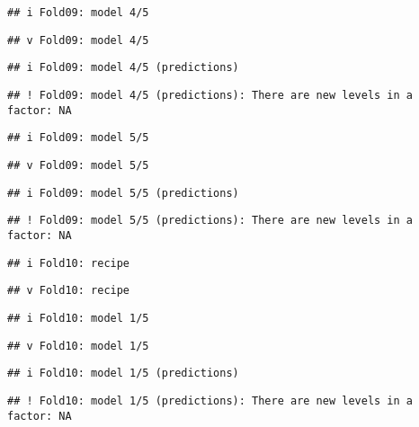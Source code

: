 \documentclass[
]{article}
\begin{document}
\begin{verbatim}
## i Fold09: model 4/5
\end{verbatim}

\begin{verbatim}
## v Fold09: model 4/5
\end{verbatim}

\begin{verbatim}
## i Fold09: model 4/5 (predictions)
\end{verbatim}

\begin{verbatim}
## ! Fold09: model 4/5 (predictions): There are new levels in a factor: NA
\end{verbatim}

\begin{verbatim}
## i Fold09: model 5/5
\end{verbatim}

\begin{verbatim}
## v Fold09: model 5/5
\end{verbatim}

\begin{verbatim}
## i Fold09: model 5/5 (predictions)
\end{verbatim}

\begin{verbatim}
## ! Fold09: model 5/5 (predictions): There are new levels in a factor: NA
\end{verbatim}

\begin{verbatim}
## i Fold10: recipe
\end{verbatim}

\begin{verbatim}
## v Fold10: recipe
\end{verbatim}

\begin{verbatim}
## i Fold10: model 1/5
\end{verbatim}

\begin{verbatim}
## v Fold10: model 1/5
\end{verbatim}

\begin{verbatim}
## i Fold10: model 1/5 (predictions)
\end{verbatim}

\begin{verbatim}
## ! Fold10: model 1/5 (predictions): There are new levels in a factor: NA
\end{verbatim}
\end{document}
